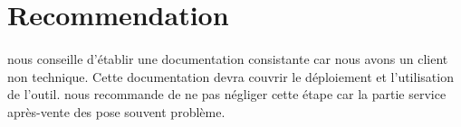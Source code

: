 \documentclass [a4paper] {article}
\begin{document}
\section{Recommendation}
\paragraph*{}
\nomTuteurQualite{} nous conseille d'établir une documentation consistante car nous avons un client non technique. Cette documentation devra couvrir le déploiement et l'utilisation de l'outil.
\nomTuteurQualite{} nous recommande de ne pas négliger cette étape car la partie \og service après-vente \fg des \PIC{} pose souvent problème.
\end{document}
